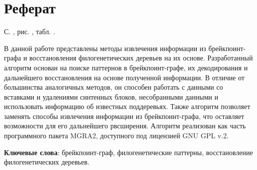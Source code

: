 \thispagestyle{empty}
\setcounter{page}{1}

\section*{Реферат}
\noindent
С. ,  рис. , табл. .

В данной работе представлены методы извлечения информации из брейкпоинт-графа и восстановления филогенетических деревьев на их основе.
Разработанный алгоритм основан на поиске паттернов в брейкпоинт-графе, их декодирования и дальнейшего восстановления на основе полученной информации.
В отличие от большинства аналогичных методов, он способен работать с данными со вставками и удалениями синтенных блоков, несобранными данными и
использовать информацию об известных поддеревьях.
Также алгоритм позволяет заменять способы извлечения информации из брейкпоинт-графа, что оставляет возможности для его дальнейшего рвсширения.
Алгоритм реализован как часть программного пакета MGRA2, доступного под лицензией GNU GPL v.2.


\textbf{Ключевые слова}: брейкпоинт-граф, филогенетические паттерны, восстановление филогенетических деревьев.

\pagebreak

